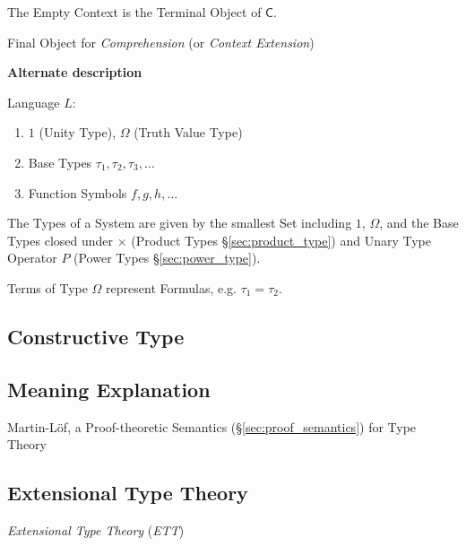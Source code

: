 The Empty Context is the Terminal Object of $\mathsf{C}$.

Final Object for \emph{Comprehension} (or \emph{Context Extension}) %



\textbf{Alternate description}\cite{bastenhof09}

Language $L$:
\begin{enumerate}
  \item $1$ (Unity Type), $\Omega$ (Truth Value Type)
  \item Base Types $\tau_1, \tau_2, \tau_3, \ldots$
  \item Function Symbols $f, g, h, \ldots$
\end{enumerate}
The Types of a System are given by the smallest Set including $1$,
$\Omega$, and the Base Types closed under $\times$ (Product Types
\S\ref{sec:product_type}) and Unary Type Operator $P$ (Power Types
\S\ref{sec:power_type}).

Terms of Type $\Omega$ represent Formulas, e.g. $\tau_1 = \tau_2$.



\subsection{Constructive Type}\label{sec:constructive_type}

\subsection{Meaning Explanation}\label{sec:meaning_explanation}

Martin-L\"of, a Proof-theoretic Semantics
(\S\ref{sec:proof_semantics}) for Type Theory



\subsection{Extensional Type Theory}\label{sec:extensional_type}
\cite{harper12}

\emph{Extensional Type Theory} (\emph{ETT})

